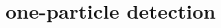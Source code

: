 \documentclass[11pt,prd,onecolumn,superscriptaddress,nofootinbib,floatfix,amsmath,amssymb]{revtex4-2}
\newcommand{\bx}{\bm{x}}
\newcommand{\sx}{\mathsf{x}}
\newcommand{\normal}[1]{:\mathrel{#1}:}
\DeclareMathOperator{\tr}{\text{tr}}
\newcommand{\rr}[1]{\left(#1\right)}
\newcommand{\eri}[1]{\textcolor{OliveGreen}{\textbf{[\textbf{\textcolor{black}{Erickson}}: #1]}}}
\newcommand{\vac}{\text{vac}}
\begin{document}
    
    	
    \section{one-particle detection}
    \label{sec: oneparticle}
    
    
\end{document}
